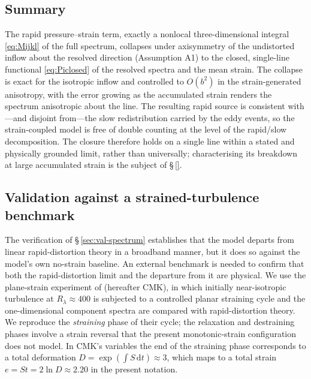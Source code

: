 \documentclass[lineno]{JFM-FLM_Au}
\begin{document}
\subsection{Summary}\label{sec:gate-summary}

The rapid pressure--strain term, exactly a nonlocal three-dimensional integral
\eqref{eq:Mijkl} of the full spectrum, collapses under axisymmetry of the
undistorted inflow about the resolved direction (Assumption A1) to the closed,
single-line functional \eqref{eq:Piclosed} of the resolved spectra and the
mean strain. The collapse is exact for the isotropic inflow and controlled to
$O(b^2)$ in the strain-generated anisotropy, with the error growing as the
accumulated strain renders the spectrum anisotropic about the line. The
resulting rapid source is consistent with---and disjoint from---the slow
redistribution carried by the eddy events, so the strain-coupled model is free
of double counting at the level of the rapid/slow decomposition. The closure
therefore holds on a single line within a stated and physically grounded
limit, rather than universally; characterising its breakdown at large
accumulated strain is the subject of \S\,\ref{}.%


\subsection{Validation against a strained-turbulence benchmark}
\label{sec:cmk}

The verification of \S\,\ref{sec:val-spectrum} establishes that the model
departs from linear rapid-distortion theory in a broadband manner, but it does
so against the model's own no-strain baseline. An external benchmark is needed
to confirm that both the rapid-distortion limit and the departure from it are
physical. We use the plane-strain experiment of \citet{ChenMeneveauKatz2006}
(hereafter CMK), in which initially near-isotropic turbulence at
$R_\lambda\approx400$ is subjected to a controlled planar straining cycle and
the one-dimensional component spectra are compared with rapid-distortion theory.
We reproduce the \emph{straining} phase of their cycle; the relaxation and
destraining phases involve a strain reversal that the present monotonic-strain
configuration does not model. In CMK's variables the end of the straining phase
corresponds to a total deformation $D=\exp(\int S\,\mathrm{d}t)\approx3$, which
maps to a total strain $e=St=2\ln D\approx2.20$ in the present notation.
\end{document}
